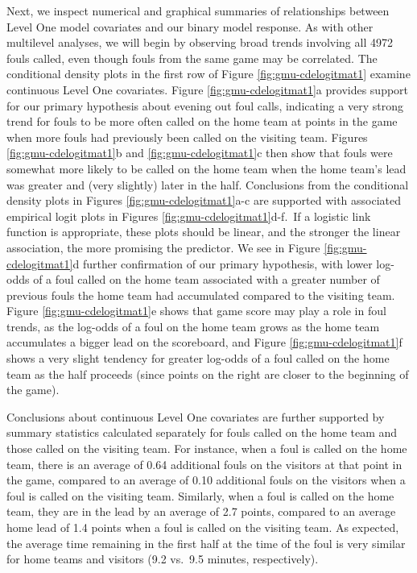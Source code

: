 \documentclass[
]{krantz}
\begin{document}
Next, we inspect numerical and graphical summaries of relationships between Level One model covariates and our binary model response. As with other multilevel analyses, we will begin by observing broad trends involving all 4972 fouls called, even though fouls from the same game may be correlated. The conditional density plots in the first row of Figure \ref{fig:gmu-cdelogitmat1} examine continuous Level One covariates. Figure \ref{fig:gmu-cdelogitmat1}a provides support for our primary hypothesis about evening out foul calls, indicating a very strong trend for fouls to be more often called on the home team at points in the game when more fouls had previously been called on the visiting team. Figures \ref{fig:gmu-cdelogitmat1}b and \ref{fig:gmu-cdelogitmat1}c then show that fouls were somewhat more likely to be called on the home team when the home team's lead was greater and (very slightly) later in the half. Conclusions from the conditional density plots in Figures \ref{fig:gmu-cdelogitmat1}a-c are supported with associated empirical logit plots in Figures \ref{fig:gmu-cdelogitmat1}d-f.~If a logistic link function is appropriate, these plots should be linear, and the stronger the linear association, the more promising the predictor. We see in Figure \ref{fig:gmu-cdelogitmat1}d further confirmation of our primary hypothesis, with lower log-odds of a foul called on the home team associated with a greater number of previous fouls the home team had accumulated compared to the visiting team. Figure \ref{fig:gmu-cdelogitmat1}e shows that game score may play a role in foul trends, as the log-odds of a foul on the home team grows as the home team accumulates a bigger lead on the scoreboard, and Figure \ref{fig:gmu-cdelogitmat1}f shows a very slight tendency for greater log-odds of a foul called on the home team as the half proceeds (since points on the right are closer to the beginning of the game).

Conclusions about continuous Level One covariates are further supported by summary statistics calculated separately for fouls called on the home team and those called on the visiting team. For instance, when a foul is called on the home team, there is an average of 0.64 additional fouls on the visitors at that point in the game, compared to an average of 0.10 additional fouls on the visitors when a foul is called on the visiting team. Similarly, when a foul is called on the home team, they are in the lead by an average of 2.7 points, compared to an average home lead of 1.4 points when a foul is called on the visiting team. As expected, the average time remaining in the first half at the time of the foul is very similar for home teams and visitors (9.2 vs.~9.5 minutes, respectively).
\end{document}
